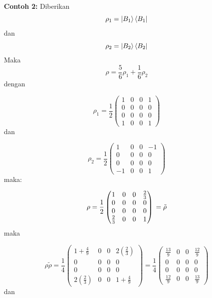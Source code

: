 \textbf{Contoh 2:}
Diberikan
\begin{equation}
	\rho_1 = \ket{B_1}\bra{B_1}
\end{equation}
dan
\begin{equation}
	\rho_2 = \ket{B_2}\bra{B_2}
\end{equation}
Maka
\begin{equation}
	\rho = \frac{5}{6}\rho_1 + \frac{1}{6}\rho_2
\end{equation}
dengan

\begin{equation}
	\rho_1 = \frac{1}{2}
	\begin{pmatrix}
		1&0&0&1\\
		0&0&0&0\\
		0&0&0&0\\
		1&0&0&1
	\end{pmatrix}
\end{equation}
dan

\begin{equation}
	\rho_2 = \frac{1}{2}
	\begin{pmatrix}
		1&0&0&-1\\
		0&0&0&0\\
		0&0&0&0\\
		-1&0&0&1
	\end{pmatrix}
\end{equation}
maka:  

\begin{equation}
	\rho =\frac{1}{2}
	\begin{pmatrix}
		1&0&0&\frac{2}{3}\\
		0&0&0&0\\
		0&0&0&0\\
		\frac{2}{3}&0&0&1
	\end{pmatrix}\\
	=\tilde{\rho}
\end{equation}
maka

\begin{equation}
	\rho \tilde{\rho}=\frac{1}{4}
	\begin{pmatrix}
		1+\frac{4}{9}&0&0&2(\frac{2}{3})\\
		0&0&0&0\\
		0&0&0&0\\
		2(\frac{2}{3})&0&0&1+\frac{4}{9}
	\end{pmatrix}
	=\frac{1}{4}
	\begin{pmatrix}
		\frac{13}{9}&0&0&\frac{12}{9}\\
		0&0&0&0\\
		0&0&0&0\\
		\frac{12}{9}&0&0&\frac{13}{9}
	\end{pmatrix}
\end{equation}
dan

